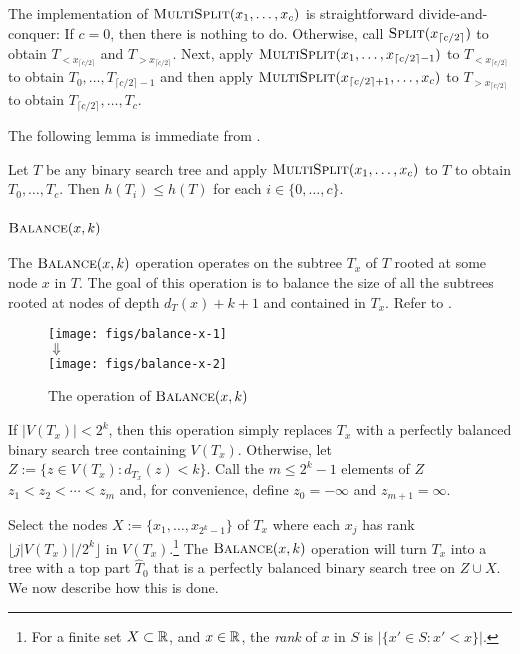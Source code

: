 \documentclass[kpfonts]{patmorin}
\let\le\leqslant
\begin{document}
The implementation of $\textsc{MultiSplit}(x_1,\dots,x_c)$ is straightforward divide-and-conquer:  If $c=0$, then there is nothing to do.  Otherwise, call $\textsc{Split}(x_{\lceil c/2\rceil})$ to obtain $T_{<x_{\lceil c/2\rceil}}$ and $T_{>x_{\lceil c/2\rceil}}$.  Next, apply $\textsc{MultiSplit}(x_1,\dots,x_{\lceil c/2\rceil-1})$ to $T_{<x_{\lceil c/2\rceil}}$ to obtain $T_0,\dots,T_{\lceil c/2\rceil-1}$ and then apply $\textsc{MultiSplit}(x_{\lceil c/2\rceil+1},\dots,x_c)$ to $T_{>x_{\lceil c/2\rceil}}$ to obtain $T_{\lceil c/2\rceil},\dots,T_c$.

The following lemma is immediate from .
\begin{lem}
  Let $T$ be any binary search tree and apply $\textsc{MultiSplit}(x_1,\dots,x_c)$ to $T$ to obtain $T_0,\dots,T_c$.  Then $h(T_i)\le h(T)$ for each $i\in\{0,\dots,c\}$.
\end{lem}

\subsubsection{$\textsc{Balance}(x,k)$}

The $\textsc{Balance}(x,k)$ operation operates on the subtree $T_x$ of $T$ rooted at some node $x$ in $T$.
The goal of this operation is to balance the size of all the subtrees rooted at nodes of depth $d_T(x)+k+1$ and contained in $T_x$.
Refer to .

\begin{figure}
    \begin{center}
      \texttt{[image: figs/balance-x-1]} \\[-2ex]
      $\Downarrow$ \\[1ex]
      \texttt{[image: figs/balance-x-2]}
    \end{center}
  \caption{The operation of $\textsc{Balance}(x,k)$}
\end{figure}

If $|V(T_x)|< 2^k$, then this operation simply replaces $T_x$ with a perfectly balanced binary search tree containing $V(T_x)$.  Otherwise, let $Z:=\{z\in V(T_x): d_{T_x}(z)< k\}$.  Call the $m\le 2^k-1$ elements of $Z$  $z_1<z_2<\cdots<z_{m}$ and, for convenience, define $z_0=-\infty$ and $z_{m+1}=\infty$.

Select the nodes $X:=\{x_1,\dots,x_{2^k-1}\}$ of $T_x$ where each $x_j$ has rank $\lfloor j|V(T_x)|/2^k\rfloor$ in $V(T_x)$.\footnote{For a finite set $X\subset\mathbb{R}$, and $x\in\mathbb{R}$, the \emph{rank} of $x$ in $S$ is $|\{x'\in S: x'<x\}|$.}  The $\textsc{Balance}(x,k)$ operation will turn $T_x$ into a tree with a top part $\hat{T}_0$ that is a perfectly balanced binary search tree on $Z\cup X$.  We now describe how this is done.
\end{document}
